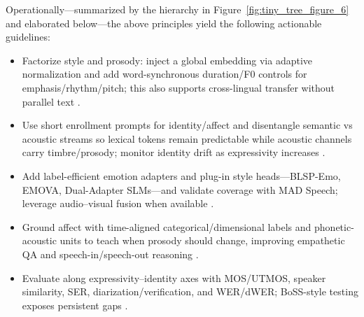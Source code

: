 \documentclass{article}
\begin{document}
Operationally---summarized by the hierarchy in Figure~\ref{fig:tiny_tree_figure_6} and elaborated below---the above principles yield the following actionable guidelines:
\begin{itemize}
\item Factorize style and prosody: inject a global embedding via adaptive normalization and add word-synchronous duration/F0 controls for emphasis/rhythm/pitch; this also supports cross-lingual transfer without parallel text \cite{huang2023holisticcascadesystembenchmarkhumanevalu}.
\item Use short enrollment prompts for identity/affect and disentangle semantic vs acoustic streams so lexical tokens remain predictable while acoustic channels carry timbre/prosody; monitor identity drift as expressivity increases \cite{wang2024evaluatingtextspeechsynthesislargediscre}.
\item Add label-efficient emotion adapters and plug-in style heads---BLSP-Emo, EMOVA, Dual-Adapter SLMs---and validate coverage with MAD Speech; leverage audio--visual fusion when available \cite{wang2024blspemotowardsempatheticlargespeechlangu,futeral2025madspeechmeasuresacousticdiversity,chen2025emovaempoweringlanguagemodelsseehearspea,wang2025dualinformationspeechlanguagemodelsemoti}.
\item Ground affect with time-aligned categorical/dimensional labels and phonetic-acoustic units to teach when prosody should change, improving empathetic QA and speech-in/speech-out reasoning \cite{wang2025incorporatingcontextualparalinguisticund,har-tuv2025pastphoneticacousticspeechtokenizer,entry2025indicsuperbspeechprocessinguniversalperf}.
\item Evaluate along expressivity--identity axes with MOS/UTMOS, speaker similarity, SER, diarization/verification, and WER/dWER; BoSS-style testing exposes persistent gaps \cite{wang2025bossbeyondsemanticspeech}.
\end{itemize}

\end{document}

